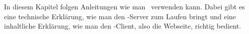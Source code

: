 

In diesem Kapitel folgen Anleitungen wie man \ZELIA\ verwenden kann. Dabei gibt es eine technische Erklärung, wie man den \ZELIA-Server zum Laufen bringt und eine inhaltliche Erklärung, wie man den \ZELIA-Client, also die Webseite, richtig bedient.





